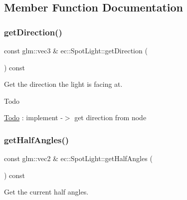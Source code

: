 \subsection{Member Function Documentation}
\mbox{\label{classec_1_1_spot_light_a373e8b5dc16c19fb7a0ba8ea5333f551}} 
\subsubsection{\texorpdfstring{get\+Direction()}{getDirection()}}
{\footnotesize\ttfamily const glm\+::vec3 \& ec\+::\+Spot\+Light\+::get\+Direction (\begin{DoxyParamCaption}{ }\end{DoxyParamCaption}) const}



Get the direction the light is facing at. 

\begin{DoxyRefDesc}{Todo}
\item[\mbox{\hyperlink{todo__todo000011}{Todo}}]\+: implement -\/$>$ get direction from node \end{DoxyRefDesc}
\mbox{\label{classec_1_1_spot_light_a1f53e54ee38973a55438c0321b78b439}} 
\subsubsection{\texorpdfstring{get\+Half\+Angles()}{getHalfAngles()}}
{\footnotesize\ttfamily const glm\+::vec2 \& ec\+::\+Spot\+Light\+::get\+Half\+Angles (\begin{DoxyParamCaption}{ }\end{DoxyParamCaption}) const}



Get the current half angles. 

\mbox{\label{classec_1_1_spot_light_a70ee7996e77f4961cca8864cea037906}} 
